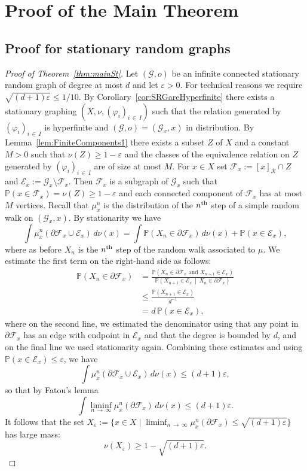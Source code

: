 \documentclass[AHL,Unicode,longabstracts,published]{cedram}
\newcommand{\bbP}{\mathbb{P}}
\newcommand{\calR}{\mathcal{R}}
\newcommand{\calE}{\mathcal{E}}
\newcommand{\calF}{\mathcal{F}}
\newcommand{\calG}{\mathcal{G}}
\begin{document}
\section{Proof of the Main Theorem}\label{sec:main_proof}

\subsection{Proof for stationary random graphs}\label{sec:stat_proof}

\begin{proof}[{Proof of Theorem~\ref{thm:mainSt}}]
Let $(\calG,o)$ be an infinite connected stationary random graph of degree at most $d$ and let $\varepsilon>0$. For technical reasons we require $\sqrt{(d+1)\varepsilon}\leq 1/10.$ By Corollary~\ref{cor:SRGareHyperfinite} there exists a stationary graphing $(X,\nu,(\varphi_i)_{i\,\in\,I})$ such that the relation generated by $ (\varphi_i)_{i\,\in\,I}$ is hyperfinite and $(\calG,o)=(\calG_x,x)$ in distribution. By Lemma~\ref{lem:FiniteComponents1} there exists a subset $Z$ of $X$ and a constant $M>0$ such that $\nu(Z)\geq 1-\varepsilon$ and the classes of the equivalence relation on $Z$ generated by $(\varphi_i)_{i\,\in\,I}$ are of size at most $M$. For $x\in X$ set $\calF_x:=[x]_{\calR}\cap Z$ and $\calE_x:=\calG_x\setminus \calF_x$. Then $\calF_x$ is a subgraph of $\calG_x$ such that $\bbP(x\in \calF_x)=\nu(Z)\geq 1-\varepsilon$ and each connected component of $\calF_x$ has at most $M$ vertices. Recall that $\mu_x^n$ is the distribution of the $n^{\rm th}$ step of a simple random walk on $(\calG_x,x)$. By stationarity we have
\[
\int \mu_x^n(\partial \calF_x\cup \calE_x) \, d\nu(x)=\int \bbP(X_n\in \partial \calF_x) \, d\nu(x) +\bbP(x\in \calE_x),
\]
where as before $X_n$ is the $n^{\rm th}$ step of the random walk associated to $\mu$. We estimate the first term on the right-hand side as follows:
\begin{align*}
\bbP(X_n\in \partial \calF_x)&=\frac{\bbP\left(X_n\in \partial \calF_x \text{ and } X_{n+1}\in \calE_x\right)}{\bbP\left(X_{n+1}\in \calE_x \,\middle|\, X_n \in \partial \calF_x\right)}\\
&\leq \frac{\bbP(X_{n+1}\in \calE_x)}{d^{-1}}\\
&=d \, \bbP(x\in \calE_x),
\end{align*}
where on the second line, we estimated the denominator using that any point in $\partial \calF_x$ has an edge with endpoint in $\calE_x$ and that the degree is bounded by $d$, and on the final line we used stationarity again. Combining these estimates and using $\bbP(x\in \calE_x)\leq \varepsilon$, we have
\[
\int \mu_x^n(\partial \calF_x\cup \calE_x) \, d\nu(x) \leq (d+1)\varepsilon,
\]
so that by Fatou's lemma
\[
\int \liminf_{n\,\to\,\infty} \mu_x^n(\partial \calF_x) \, d\nu(x)\leq (d+1)\varepsilon.
\]
It follows that the set $\displaystyle X_\varepsilon:=\{x\in X \mid \liminf_{n\,\to\,\infty} \mu_x^n(\partial \calF_x)\leq \sqrt{(d+1)\varepsilon}\}$ has large mass:
\begin{equation}\label{eqn:MeasureOfGoodSet}
\nu(X_\varepsilon)\geq 1-\sqrt{(d+1)\varepsilon}.
\end{equation}


\end{proof}
\end{document}
